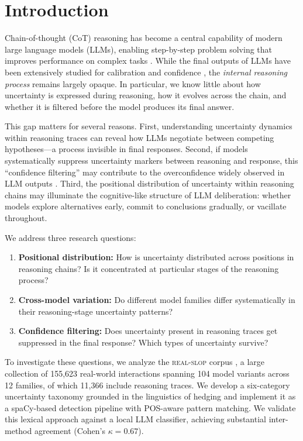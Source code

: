\section{Introduction}

Chain-of-thought (CoT) reasoning has become a central capability of modern large language models (LLMs), enabling step-by-step problem solving that improves performance on complex tasks \citep{wei2022chain, kojima2022large}. While the final outputs of LLMs have been extensively studied for calibration and confidence \citep{kadavath2022language, tian2023just}, the \emph{internal reasoning process} remains largely opaque. In particular, we know little about how uncertainty is expressed during reasoning, how it evolves across the chain, and whether it is filtered before the model produces its final answer.

This gap matters for several reasons. First, understanding uncertainty dynamics within reasoning traces can reveal how LLMs negotiate between competing hypotheses---a process invisible in final responses. Second, if models systematically suppress uncertainty markers between reasoning and response, this ``confidence filtering'' may contribute to the overconfidence widely observed in LLM outputs \citep{mielke2022reducing, zhou2024relying}. Third, the positional distribution of uncertainty within reasoning chains may illuminate the cognitive-like structure of LLM deliberation: whether models explore alternatives early, commit to conclusions gradually, or vacillate throughout.

We address three research questions:

\begin{enumerate}
    \item[\textbf{RQ1}] \textbf{Positional distribution:} How is uncertainty distributed across positions in reasoning chains? Is it concentrated at particular stages of the reasoning process?
    \item[\textbf{RQ2}] \textbf{Cross-model variation:} Do different model families differ systematically in their reasoning-stage uncertainty patterns?
    \item[\textbf{RQ3}] \textbf{Confidence filtering:} Does uncertainty present in reasoning traces get suppressed in the final response? Which types of uncertainty survive?
\end{enumerate}

To investigate these questions, we analyze the \textsc{real-slop} corpus \citep{solenopsisbot2025realslop}, a large collection of 155,623 real-world interactions spanning 104 model variants across 12 families, of which 11,366 include reasoning traces. We develop a six-category uncertainty taxonomy grounded in the linguistics of hedging \citep{hyland1998hedging, holmes1988doubt} and implement it as a spaCy-based detection pipeline with POS-aware pattern matching. We validate this lexical approach against a local LLM classifier, achieving substantial inter-method agreement (Cohen's $\kappa = 0.67$).

